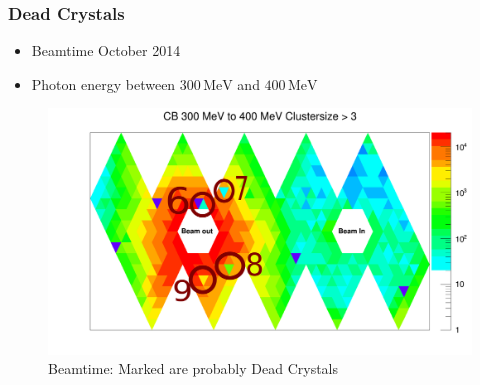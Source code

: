 \documentclass[slidestop,compress,mathserif]{beamer}
\begin{document}
\begin{frame}
	\frametitle{Dead Crystals}
	\begin{itemize}
		\item Beamtime October 2014
		\item Photon energy between $300\,\text{MeV}$ and $400\,\text{MeV}$
	\end{itemize}



	\begin{figure}
		\centering
		\begin{minipage}[t]{.6\textwidth}
			\centering
			\vspace{0pt}
			\includegraphics[width=\textwidth]{Pictures/20172504StrahlzeitMoreDead}
			\caption{Beamtime: Marked are probably Dead Crystals}
		\end{minipage}\hfill
		\begin{minipage}[t]{.4\textwidth}
			\centering
			\vspace{0pt}
\end{minipage}
\end{figure}
\end{frame}
\end{document}
